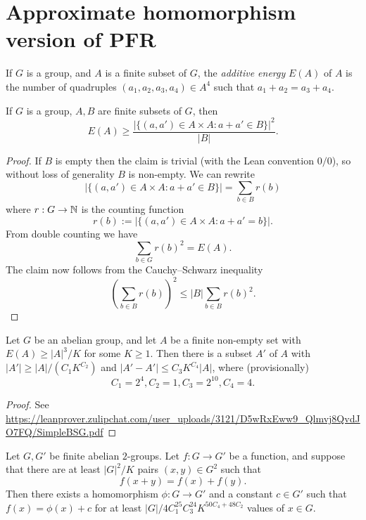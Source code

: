 \chapter{Approximate homomorphism version of PFR}

\begin{definition}\label{energy-def}\leanok  If $G$ is a group, and $A$ is a finite subset of $G$, the \emph{additive energy} $E(A)$ of $A$ is the number of quadruples $(a_1,a_2,a_3,a_4) \in A^4$ such that $a_1+a_2 = a_3+a_4$.
\end{definition}

\begin{lemma}\label{cs-bound}\leanok  If $G$ is a group, $A,B$ are finite subsets of $G$, then
$$ E(A) \geq \frac{|\{ (a,a') \in A \times A: a+a' \in B \}|^2}{|B|}.$$
\end{lemma}

\begin{proof}  If $B$ is empty then the claim is trivial (with the Lean convention $0/0$), so without loss of generality $B$ is non-empty.  We can rewrite
$$ |\{ (a,a') \in A \times A: a+a' \in B \}| = \sum_{b \in B} r(b)$$
where $r: G \to \mathbb{N}$ is the counting function
$$ r(b) := |\{ (a,a') \in A \times A: a+a' = b \}|.$$
From double counting we have
$$ \sum_{b \in G} r(b)^2 = E(A).$$
The claim now follows from the Cauchy--Schwarz inequality
$$ (\sum_{b \in B} r(b))^2 \leq |B| \sum_{b \in B} r(b)^2.$$
\end{proof}

\begin{lemma}\label{bsg}\leanok Let $G$ be an abelian group, and let $A$ be a finite non-empty set with $E(A) \geq |A|^3 / K$ for some $K \geq 1$.  Then there is a subset $A'$ of $A$ with $|A'| \geq |A| / (C_1 K^{C_2})$ and $|A'-A'| \leq C_3 K^{C_4} |A|$, where (provisionally)
$$ C_1 = 2^4, C_2 = 1, C_3 = 2^{10}, C_4 = 4.$$
\end{lemma}

\begin{proof} See \url{https://leanprover.zulipchat.com/user_uploads/3121/D5wRxEww9_Qlmvj8QvdJO7FQ/SimpleBSG.pdf}
\end{proof}

\begin{theorem}\label{approx-hom-pfr} Let $G,G'$ be finite abelian $2$-groups.
  Let $f: G \to G'$ be a function, and suppose that there are at least $|G|^2 / K$ pairs $(x,y) \in G^2$ such that
$$ f(x+y) = f(x) + f(y).$$
Then there exists a homomorphism $\phi: G \to G'$ and a constant $c \in G'$ such that $f(x) = \phi(x)+c$ for at least $|G| / 4C_1^{25} C_3^{24} K^{50C_4+48 C_2}$ values of $x \in G$.
\end{theorem}

